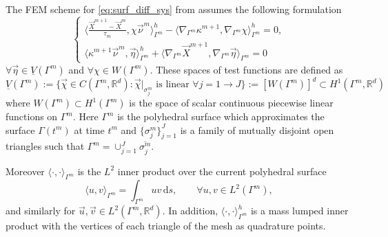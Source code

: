 \documentclass[a4paper,11pt, onecolumn]{article}
\begin{document}
The FEM scheme for \eqref{eq:surf_diff_sys} from \cite{gflows3d} assumes the
following formulation
\begin{equation}\label{eq:fem_surf_diff}
 \begin{cases}
  \langle \frac{\vec{X}^{m + 1} - \vec{X}^{m}}{\tau_m},
  \chi\vec{\nu}^m\rangle_{\Gamma^m}^{h} - \langle\nabla_{
  \Gamma^m}\kappa^{m+1}, \nabla_{\Gamma^m}\chi \rangle_{\Gamma^m}^{h} = 0,\\
  \langle\kappa^{m+1}\vec{\nu}^m,
  \vec{\eta}\rangle_{\Gamma^m}^{h} + \langle\nabla_{\Gamma^m}\vec{X}^{m + 1},
  \nabla_{\Gamma^m}\vec{\eta} \rangle_{\Gamma^m}=0
 \end{cases}
\end{equation}
$\forall\vec{\eta}\in\underline{V}(\Gamma^m)$ and $\forall\chi\in W(\Gamma^m)$.
These spaces of test functions are defined as
\begin{equation}\label{eq:space_test_functions}
 \underline{V}(\Gamma^m) := \{\vec{\chi}\in C(\Gamma^m,\mathbb{R}^d) :
\vec{\chi}|_{\sigma_j^m}\textrm{ is linear }\forall j=1\rightarrow J\} :=
[W(\Gamma^m)]^d\subset H^1(\Gamma^m,\mathbb{R}^d)
\end{equation}
where $W(\Gamma^m)\subset H^1(\Gamma^m)$ is the space of scalar continuous
piecewise linear functions on $\Gamma^m$. Here $\Gamma^m$ is the polyhedral
surface which approximates the surface $\Gamma (t^m)$ at time $t^m$ and
$\{\sigma_j^m\}_{j=1}^J$ is a family of mutually disjoint open triangles such
that $\Gamma^m=\cup_{j=1}^J\overline{\sigma_j^m}$.
\newline

Moreover $\langle\cdot,\cdot\rangle_{\Gamma^m}$ is the $L^2$ inner product over
the current polyhedral surface
\begin{equation}\label{}
 \langle u,v\rangle_{\Gamma^m} = \int_{\Gamma^m}uv\,\mathrm{d}s,\qquad\forall
  u,v\in L^2(\Gamma^m),
\end{equation}
and similarly for $\vec{u},\vec{v}\in L^2(\Gamma^m,\mathbb{R}^d)$. In addition,
$\langle \cdot,\cdot\rangle_{\Gamma^m}^h$ is a mass lumped inner product with
the vertices of each triangle of the mesh as quadrature points.
\newline
\end{document}
